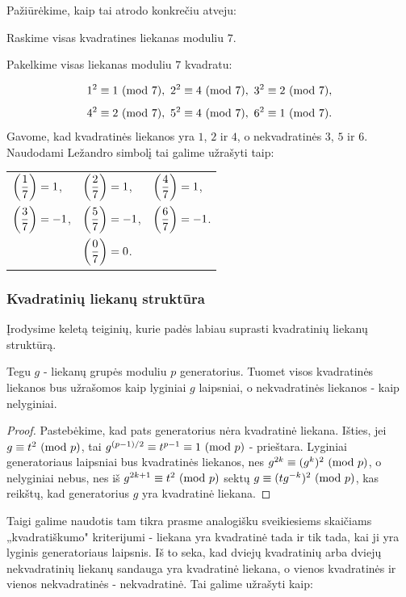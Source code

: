 Pažiūrėkime, kaip tai atrodo konkrečiu atveju:
\begin{pav} Raskime visas kvadratines liekanas moduliu $7$.
\end{pav}
\begin{sprendimas}
Pakelkime visas liekanas moduliu $7$ kvadratu: 

$$1^2 \equiv 1 \ (\text{mod } 7),\ 2^2 \equiv 4 \ (\text{mod } 7),\ 3^2 \equiv 2 \ (\text{mod } 7),$$ $$4^2
\equiv 2 \ (\text{mod } 7),\ 5^2 \equiv 4 \ (\text{mod } 7),\ 6^2 \equiv 1 \ (\text{mod } 7).$$
Gavome, kad kvadratinės liekanos yra $1$, $2$ ir $4$, o nekvadratinės $3$,
$5$ ir $6$. Naudodami Ležandro simbolį tai galime užrašyti taip:
\begin{center}\begin{tabular}{l l l}
  $\displaystyle{\left(\frac{1}{7}\right)=1}$,& $\displaystyle{\left(\frac{2}{7}\right)=1}$,&
  $\displaystyle{\left(\frac{4}{7}\right)=1}$, \\ 
  $\displaystyle{\left(\frac{3}{7}\right)=-1}$,& $\displaystyle{\left(\frac{5}{7}\right)=-1}$,&
  $\displaystyle{\left(\frac{6}{7}\right)=-1}$.\rule{0pt}{4ex} \\
  & $\displaystyle{\left(\frac{0}{7}\right)=0}$.\rule{0pt}{4ex} &
\end{tabular}\end{center}
\end{sprendimas}

\subsubsection{Kvadratinių liekanų struktūra}

Įrodysime keletą teiginių, kurie padės labiau suprasti kvadratinių liekanų
struktūrą.

\begin{teig} Tegu $g$ - liekanų grupės moduliu $p$ generatorius. Tuomet
  visos kvadratinės liekanos bus užrašomos kaip lyginiai $g$ laipsniai, o
  nekvadratinės liekanos - kaip nelyginiai.  
\end{teig} 

\begin{proof} Pastebėkime, kad pats generatorius nėra kvadratinė
liekana. Išties, jei $g \equiv t^2 \ (\text{mod } p)$, tai $g^{(p-1)/2} \equiv
t^{p-1} \equiv 1 \ (\text{mod } p)$ - prieštara.
Lyginiai generatoriaus laipsniai bus kvadratinės liekanos, nes
$g^{2k}\equiv (g^{k})^2 \ (\text{mod } p)$, o nelyginiai nebus, nes iš  $g^{2k+1}\equiv
t^2 \ (\text{mod } p)$ sektų $g\equiv (tg^{-k})^2\ (\text{mod } p)$, kas reikštų, kad
generatorius $g$ yra kvadratinė liekana. 
\end{proof}


Taigi galime naudotis tam tikra prasme analogišku sveikiesiems skaičiams
„kvadratiškumo" kriterijumi - liekana yra kvadratinė tada ir tik tada, kai
ji yra lyginis generatoriaus laipsnis. Iš to seka, kad dviejų kvadratinių
arba dviejų nekvadratinių liekanų sandauga yra kvadratinė liekana, o vienos
kvadratinės ir vienos nekvadratinės - nekvadratinė. Tai galime užrašyti
kaip: 

